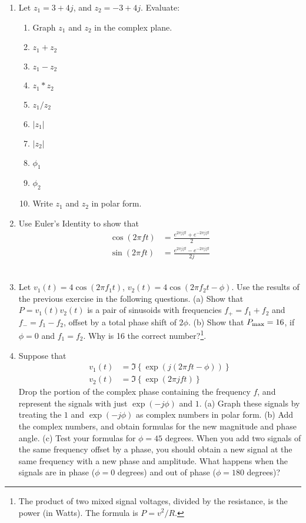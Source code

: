 \documentclass{article}
\begin{document}
\begin{enumerate}
\item Let $z_1 = 3 + 4j$, and $z_2 = -3 + 4j$.  Evaluate: 
\begin{enumerate}
\item Graph $z_1$ and $z_2$ in the complex plane.
\item $z_1 + z_2$
\item $z_1 - z_2$
\item $z_1 * z_2$
\item $z_1 / z_2$
\item $|z_1|$
\item $|z_2|$
\item $\phi_1$
\item $\phi_2$
\item Write $z_1$ and $z_2$ in polar form.
\end{enumerate}
\vspace{4.5cm}
\item Use Euler's Identity to show that
\begin{align}
\cos(2\pi ft) &= \frac{e^{2\pi j ft} + e^{-2\pi j ft}}{2} \\
\sin(2\pi ft) &= \frac{e^{2\pi j ft} - e^{-2\pi j ft}}{2j}
\end{align} \\ \vspace{3.0cm}
\item Let $v_1(t) = 4\cos(2\pi f_1 t)$, $v_2(t) = 4\cos(2\pi f_2 t -\phi)$.  Use the results of the previous exercise in the following questions.  (a) Show that $P = v_1(t) v_2(t)$ is a pair of sinusoids with frequencies $f_{+} = f_1 + f_2$ and $f_{-} = f_1 - f_2$, offset by a total phase shift of $2\phi$. (b) Show that $P_{\rm max} = 16$, if $\phi = 0$ and $f_1 = f_2$.  Why is 16 the correct number?\footnote{The product of two mixed signal voltages, divided by the resistance, is the power (in Watts).  The formula is $P = v^2/R$.}. \\ \vspace{3.5cm}
\item Suppose that 
\begin{align}
v_1(t) &= \Im \left\lbrace\exp(j(2\pi ft-\phi))\right\rbrace \\
v_2(t) &= \Im \left\lbrace\exp(2\pi jft)\right\rbrace
\end{align}
Drop the portion of the complex phase containing the frequency $f$, and represent the signals with just $\exp(-j\phi)$ and $1$. (a) Graph these signals by treating the $1$ and $\exp(-j\phi)$ as complex numbers in polar form. (b) Add the complex numbers, and obtain formulas for the new magnitude and phase angle. (c) Test your formulas for $\phi = 45$ degrees.  When you add two signals of the same frequency offset by a phase, you should obtain a new signal at the same frequency with a new phase and amplitude.  What happens when the signals are in phase ($\phi = 0$ degrees) and out of phase ($\phi = 180$ degrees)? \\ \vspace{4cm}
\end{enumerate}
\end{document}
